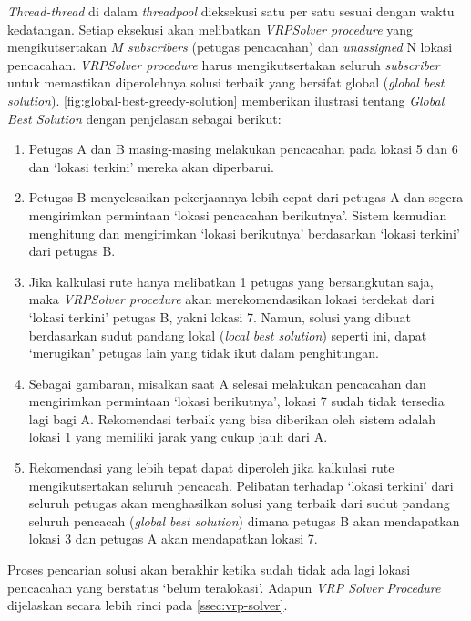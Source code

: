 \textit{Thread-thread} di dalam \textit{threadpool} dieksekusi satu per satu sesuai dengan waktu kedatangan. Setiap eksekusi akan melibatkan \textit{VRPSolver procedure} yang mengikutsertakan $M$ \textit{subscribers} (petugas pencacahan) dan \textit{unassigned} N lokasi pencacahan. \textit{VRPSolver procedure} harus mengikutsertakan seluruh \textit{subscriber} untuk memastikan diperolehnya solusi terbaik yang bersifat global (\textit{global best solution}). \autoref{fig:global-best-greedy-solution} memberikan ilustrasi tentang \textit{Global Best Solution} dengan penjelasan sebagai berikut:
\begin{enumerate}
	\item Petugas A dan B masing-masing melakukan pencacahan pada lokasi 5 dan 6 dan `lokasi terkini' mereka akan diperbarui.
	\item Petugas B menyelesaikan pekerjaannya lebih cepat dari petugas A dan segera mengirimkan permintaan `lokasi pencacahan berikutnya'. Sistem kemudian menghitung dan mengirimkan `lokasi berikutnya' berdasarkan `lokasi terkini' dari petugas B. 
	\item Jika kalkulasi rute hanya melibatkan 1 petugas yang bersangkutan saja, maka \textit{VRPSolver procedure} akan merekomendasikan lokasi terdekat dari `lokasi terkini' petugas B, yakni lokasi 7. Namun, solusi yang dibuat berdasarkan sudut pandang lokal (\textit{local best solution}) seperti ini, dapat `merugikan' petugas lain yang tidak ikut dalam penghitungan. 
	\item Sebagai gambaran, misalkan saat A selesai melakukan pencacahan dan mengirimkan permintaan `lokasi berikutnya', lokasi 7 sudah tidak tersedia lagi bagi A. Rekomendasi terbaik yang bisa diberikan oleh sistem adalah lokasi 1 yang memiliki jarak yang cukup jauh dari A. 
	\item Rekomendasi yang lebih tepat dapat diperoleh jika kalkulasi rute mengikutsertakan seluruh pencacah. Pelibatan terhadap `lokasi terkini' dari seluruh petugas akan menghasilkan solusi yang terbaik dari sudut pandang seluruh pencacah (\textit{global best solution}) dimana petugas B akan mendapatkan lokasi 3 dan petugas A akan mendapatkan lokasi 7. 

\end{enumerate}

Proses pencarian solusi akan berakhir ketika sudah tidak ada lagi lokasi pencacahan yang berstatus `belum teralokasi'. Adapun \textit{VRP Solver Procedure} dijelaskan secara lebih rinci pada \autoref{ssec:vrp-solver}.



